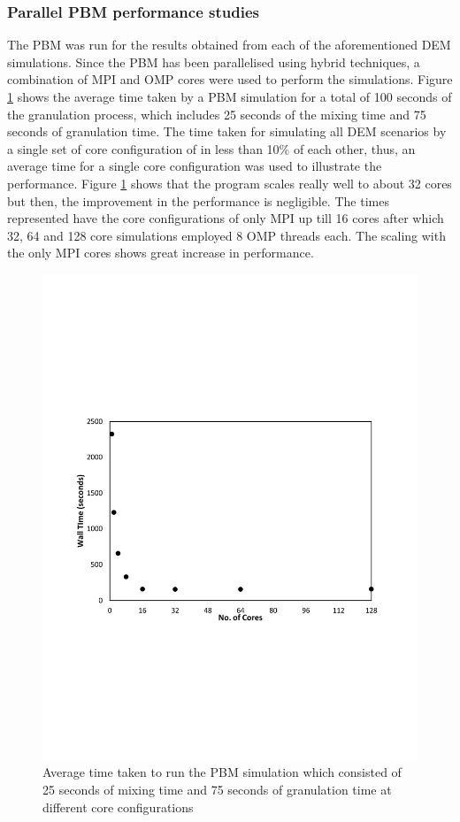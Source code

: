 \documentclass[preprint,11pt,authoryear]{elsarticle}
\begin{document}
\subsubsection{Parallel PBM performance studies}
\par The PBM was run for the results obtained from each of the aforementioned DEM simulations. 
Since the PBM has been parallelised using hybrid techniques, a combination of MPI and OMP cores 
were used to perform the simulations. Figure \ref{fig:rslts_PBM_timing_studies} shows the average time 
taken by a PBM simulation for a total of 100 seconds of the granulation process, which includes 25 
seconds of the mixing time and 75 seconds of granulation time. The time taken for simulating all DEM 
scenarios by a single set of core configuration of in less than 10\% of each other, thus, an  average 
time for a single core configuration was used to illustrate the performance. Figure 
\ref{fig:rslts_PBM_timing_studies} shows that the program scales really well to about 32 cores but then, 
the improvement in the performance is negligible. The times represented have the core configurations 
of only MPI up till 16 cores after which 32, 64 and 128 core simulations employed 8 OMP threads 
each. The scaling with the only MPI cores shows great increase in performance. \\
\begin{figure}[H]
\centering
\includegraphics[scale=0.7]{rslts_PBM_Time_analysis.pdf}
\caption{Average time taken to run the PBM simulation which consisted of 25 seconds of mixing time 
    and 75 seconds of granulation time at different core configurations}
\label{fig:rslts_PBM_timing_studies}
\end{figure}
\end{document}
